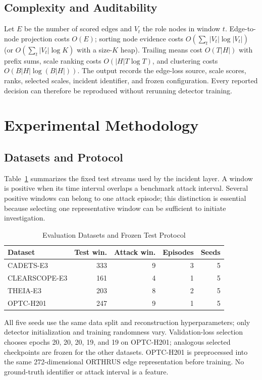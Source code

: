 \documentclass[lettersize,journal]{IEEEtran}
\newcommand{\dataset}[1]{\textsc{#1}}
\begin{document}
\subsection{Complexity and Auditability}

Let $E$ be the number of scored edges and $V_t$ the role nodes in window $t$.
Edge-to-node projection costs $O(E)$; sorting node evidence costs
$O(\sum_t |V_t|\log|V_t|)$ (or $O(\sum_t |V_t|\log K)$ with a size-$K$ heap).
Trailing means cost $O(T|H|)$ with prefix sums, scale ranking costs
$O(|H|T\log T)$, and clustering costs $O(B|H|\log(B|H|))$.  The output records
the edge-loss source, scale scores, ranks, selected scales, incident identifier,
and frozen configuration.  Every reported decision can therefore be reproduced
without rerunning detector training.

\section{Experimental Methodology}
\label{sec:setup}

\subsection{Datasets and Protocol}

Table~\ref{tab:datasets} summarizes the fixed test streams used by the incident
layer.  A window is positive when its time interval overlaps a benchmark attack
interval.  Several positive windows can belong to one attack episode; this
distinction is essential because selecting one representative window can be
sufficient to initiate investigation.

\begin{table}[!t]
\caption{Evaluation Datasets and Frozen Test Protocol}
\label{tab:datasets}
\centering
\footnotesize
\setlength{\tabcolsep}{3.6pt}
\begin{tabular}{lrrrr}
\toprule
Dataset & Test win. & Attack win. & Episodes & Seeds\\
\midrule
\dataset{CADETS-E3}     & 333 & 9 & 3 & 5\\
\dataset{CLEARSCOPE-E3} & 161 & 4 & 1 & 5\\
\dataset{THEIA-E3}      & 203 & 8 & 2 & 5\\
\dataset{OPTC-H201}     & 247 & 9 & 1 & 5\\
\bottomrule
\end{tabular}
\end{table}

All five seeds use the same data split and reconstruction hyperparameters; only
detector initialization and training randomness vary.  Validation-loss selection
chooses epochs 20, 20, 20, 19, and 19 on OPTC-H201; analogous selected
checkpoints are frozen for the other datasets.  OPTC-H201 is preprocessed into
the same 272-dimensional ORTHRUS edge representation before training.  No
ground-truth identifier or attack interval is a feature.
\end{document}

